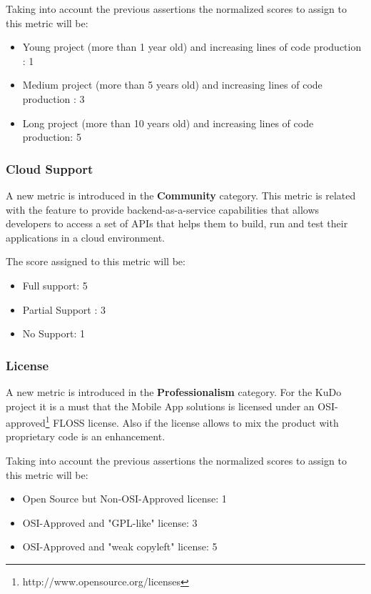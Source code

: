 \documentclass[a4paper,12pt]{book}
\begin{document}
Taking into account the previous assertions the normalized scores to assign to this metric will be:
\begin{itemize}
 \item Young project (more than 1 year old) and increasing lines of code production : 1
  \item Medium project (more than 5 years old) and increasing lines of code production : 3
 \item Long project (more than 10 years old) and increasing lines of code production: 5
\end{itemize}

\subsubsection{Cloud Support}
\label{Cloud Support}
A new metric is introduced in the \textbf{Community} category. This metric is related with the feature to provide backend-as-a-service capabilities that allows developers to access a set of APIs that helps them to build, run and test their applications in a cloud environment.

The score assigned to this metric will be:
\begin{itemize}
 \item Full support: 5
  \item Partial Support : 3
 \item No Support: 1
\end{itemize}

\subsubsection{License}
\label{License}

A new metric is introduced in the \textbf{Professionalism} category. For the KuDo project it is a must that the Mobile App solutions is licensed under an OSI-approved\footnote{http://www.opensource.org/licenses} FLOSS license. Also if the license allows to mix the product with proprietary code is an enhancement.

Taking into account the previous assertions the normalized scores to assign to this metric will be:
\begin{itemize}
 \item Open Source but Non-OSI-Approved license: 1
 \item OSI-Approved and "GPL-like" license: 3
 \item OSI-Approved and "weak copyleft" license: 5
\end{itemize}
\end{document}
